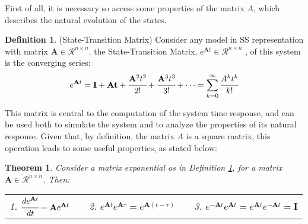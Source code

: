 \documentclass[a4paper,11pt]{book}
\numberwithin{figure}{chapter}
\numberwithin{equation}{chapter}
\numberwithin{table}{chapter}
\newtheorem{theorem}{Theorem}[chapter]
\theoremstyle{definition}
\newtheorem{definition}{Definition}[chapter]
\begin{document}
First of all, it is necessary so access some properties of the matrix $A$, which describes the natural evolution of the states. 

\begin{definition}{(State-Transition Matrix)} \label{def:stateTransM}
	Consider any model in SS representation with matrix $\mathbf{A} \in \mathcal{R}^{n \times n}$. the State-Transition Matrix, $e^{\mathbf{A}t} \in \mathcal{R}^{n \times n}$ , of this system is the converging series:
\begin{equation}
	e^{\mathbf{A}t} = \mathbf{I} + \mathbf{At} + \cfrac{\mathbf{A}^2 t^2}{2!} + \cfrac{\mathbf{A}^3 t^3}{3!} + \cdots = \sum_{k=0}^{\infty} \cfrac{A^k t^k}{k!}
\end{equation} 
\end{definition}

This matrix is central to the computation of the system time response, and can be used both to simulate the system and to analyze the properties of its natural response.  Given that, by definition, the matrix $A$ is a square matrix, this operation leads to some useful properties, as stated below:

\begin{theorem}
	Consider a matrix exponential as in Definition \ref{def:stateTransM}, for a matrix $\mathbf{A}  \in \mathcal{R}^{n \times n}$. Then:
	
\begin{tabular}{c c c c c}
		1. $\cfrac{d e^{\mathbf{A} t}}{dt} = \mathbf{A} e^{\mathbf{A} t}$ & &
		2. $e^{\mathbf{A} t} e^{\mathbf{A} \tau} = e^{\mathbf{A} (t - \tau)}$ & &
		3. $e^{-\mathbf{A} t} e^{\mathbf{A} t} = e^{\mathbf{A} t} e^{-\mathbf{A} t} = \mathbf{I}$
	\end{tabular}
\end{theorem}
\end{document}
